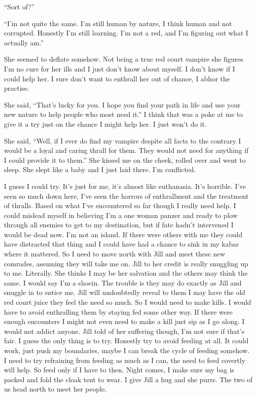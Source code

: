 ``Sort of?''

``I'm not quite the same. I'm still human by nature, I think human and not corrupted. Honestly I'm still learning. I'm not a red, and I'm figuring out what I actually am.''

She seemed to deflate somehow. Not being a true red court vampire she figures I'm no cure for her ills and I just don't know about myself. I don't know if I could help her. I sure don't want to enthrall her out of chance, I abhor the practise.

She said, ``That's lucky for you. I hope you find your path in life and use your new nature to help people who most need it.'' I think that was a poke at me to give it a try just on the chance I might help her. I just won't do it.

She said, ``Well, if I ever do find my vampire despite all facts to the contrary I would be a loyal and caring thrall for them. They would not need for anything if I could provide it to them.'' She kissed me on the cheek, rolled over and went to sleep. She slept like a baby and I just laid there. I'm conflicted.

I guess I could try. It's just for me, it's almost like euthanasia. It's horrible. I've seen so much down here, I've seen the horrors of enthrallment and the treatment of thralls. 
Based on what I've encountered so far though I really need help. I could mislead myself in believing I'm a one woman panzer and ready to plow through all enemies to get to my destination, but if fate hadn't intervened I would be dead now. I'm not an island. If there were others with me they could have distracted that thing and I could have had a chance to sink in my kabar where it mattered.
So I need to move north with Jill and meet these new comrades, assuming they will take me on.
Jill to her credit is really snuggling up to me. Literally. She thinks I may be her salvation and the others may think the same. I would say I'm a shoein.
The trouble is they may do exactly as Jill and snuggle in to entice me. Jill will undoubtedly reveal to them I may have the old red court juice they feel the need so much.
So I would need to make kills. I would have to avoid enthralling them by staying fed some other way. If there were enough encounters I might not even need to make a kill just sip as I go along. I would not addict anyone.
Jill told of her suffering though, I'm not sure if that's fair.
I guess the only thing is to try. Honestly try to avoid feeding at all. It could work, just push my boundaries, maybe I can break the cycle of feeding somehow.
I need to try refraining from feeding as much as I can, the need to feed covertly will help.
So feed only if I have to then.
Night comes, I make sure my bag is packed and fold the cloak tent to wear. I give Jill a hug and she purrs. The two of us head north to meet her people.

